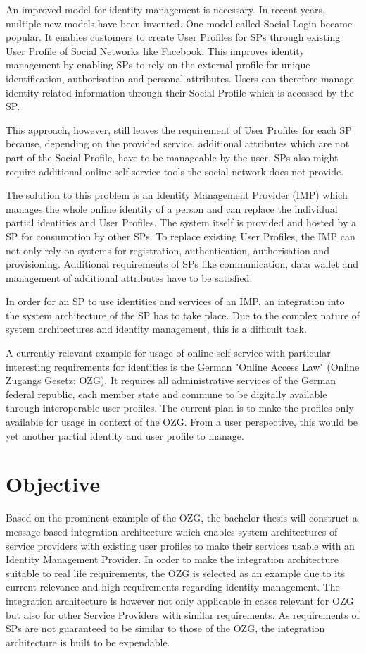 \documentclass[
     12pt,         %
     a4paper,      %
     BCOR=10mm,version=first,     %
     DIV=14,version=first,        %
     ]{scrreprt}
\begin{document}
An improved model for identity management is necessary. In recent years, multiple new models have been invented. One model called Social Login became popular. It enables customers to create User Profiles for SPs through existing User Profile of Social Networks like Facebook. This improves identity management by enabling SPs to rely on the external profile for unique identification, authorisation and personal attributes. Users can therefore manage identity related information through their Social Profile which is accessed by the SP.

This approach, however, still leaves the requirement of User Profiles for each SP because, depending on the provided service, additional attributes which are not part of the Social Profile, have to be manageable by the user. SPs also might require additional online self-service tools the social network does not provide.

The solution to this problem is an Identity Management Provider (IMP) which manages the whole online identity of a person and can replace the individual partial identities and User Profiles. The system itself is provided and hosted by a SP for consumption by other SPs. To replace existing User Profiles, the IMP can not only rely on systems for registration, authentication, authorisation and provisioning. Additional requirements of SPs like communication, data wallet and management of additional attributes have to be satisfied.

In order for an SP to use identities and services of an IMP, an integration into the system architecture of the SP has to take place. Due to the complex nature of system architectures and identity management, this is a difficult task.

A currently relevant example for usage of online self-service with particular interesting requirements for identities is the German "Online Access Law" (Online Zugangs Gesetz: OZG). It requires all administrative services of the German federal republic, each member state and commune to be digitally available through interoperable user profiles. The current plan is to make the profiles only available for usage in context of the OZG. From a user perspective, this would be yet another partial identity and user profile to manage.

\chapter{Objective}
Based on the prominent example of the OZG, the bachelor thesis will construct a message based integration architecture which enables system architectures of service providers with existing user profiles to make their services usable with an Identity Management Provider. In order to make the integration architecture suitable to real life requirements, the OZG is selected as an example due to its current relevance and high requirements regarding identity management. The integration architecture is however not only applicable in cases relevant for OZG but also for other Service Providers with similar requirements. As requirements of SPs are not guaranteed to be similar to those of the OZG, the integration architecture is built to be expendable.
\end{document}
